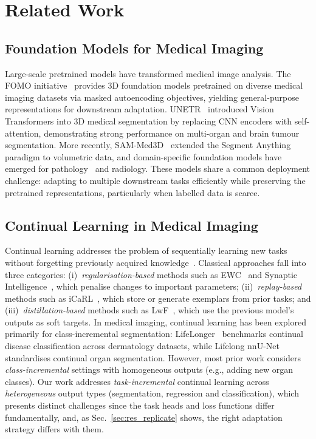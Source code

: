\iffull\documentclass[journal]{IEEEtran}\else\documentclass[journal,twoside,web]{ieeecolor}\usepackage{generic}\fi
\begin{document}
\iffull  %
\section{Related Work}
\label{sec:related}

\subsection{Foundation Models for Medical Imaging}

Large-scale pretrained models have transformed medical image analysis. The FOMO initiative~\cite{fomo2025} provides 3D foundation models pretrained on diverse medical imaging datasets via masked autoencoding objectives, yielding general-purpose representations for downstream adaptation. UNETR~\cite{unetr} introduced Vision Transformers into 3D medical segmentation by replacing CNN encoders with self-attention, demonstrating strong performance on multi-organ and brain tumour segmentation. More recently, SAM-Med3D~\cite{sammed3d} extended the Segment Anything paradigm to volumetric data, and domain-specific foundation models have emerged for pathology~\cite{chen2024towards} and radiology. These models share a common deployment challenge: adapting to multiple downstream tasks efficiently while preserving the pretrained representations, particularly when labelled data is scarce.

\subsection{Continual Learning in Medical Imaging}

Continual learning addresses the problem of sequentially learning new tasks without forgetting previously acquired knowledge~\cite{mccloskey1989catastrophic}. Classical approaches fall into three categories: (i)~\emph{regularisation-based} methods such as EWC~\cite{kirkpatrick2017} and Synaptic Intelligence~\cite{zenke2017continual}, which penalise changes to important parameters; (ii)~\emph{replay-based} methods such as iCaRL~\cite{rebuffi2017icarl}, which store or generate exemplars from prior tasks; and (iii)~\emph{distillation-based} methods such as LwF~\cite{li2017lwf}, which use the previous model's outputs as soft targets. In medical imaging, continual learning has been explored primarily for class-incremental segmentation: LifeLonger~\cite{derakhshani2022lifelonger} benchmarks continual disease classification across dermatology datasets, while Lifelong nnU-Net~\cite{gonzalez2023lifelong} standardises continual organ segmentation. However, most prior work considers \emph{class-incremental} settings with homogeneous outputs (e.g., adding new organ classes). Our work addresses \emph{task-incremental} continual learning across \emph{heterogeneous} output types (segmentation, regression and classification), which presents distinct challenges since the task heads and loss functions differ fundamentally, and, as Sec.~\ref{sec:res_replicate} shows, the right adaptation strategy differs with them.
\end{document}
